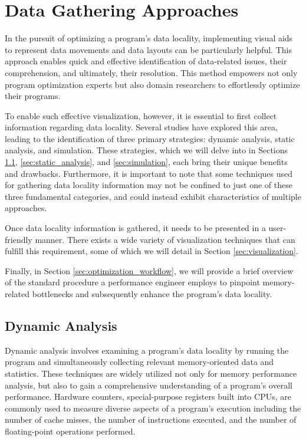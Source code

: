 \section{Data Gathering Approaches}\label{sec:methods}
In the pursuit of optimizing a program's data locality, implementing visual aids to represent data movements and data layouts can be particularly helpful. This approach enables quick and effective identification of data-related issues, their comprehension, and ultimately, their resolution. This method empowers not only program optimization experts but also domain researchers to effortlessly optimize their programs.

To enable such effective visualization, however, it is essential to first collect information regarding data locality. Several studies have explored this area, leading to the identification of three primary strategies: dynamic analysis, static analysis, and simulation. These strategies, which we will delve into in Sections \ref{sec:dynamic_analysis}, \ref{sec:static_analysis}, and \ref{sec:simulation}, each bring their unique benefits and drawbacks. Furthermore, it is important to note that some techniques used for gathering data locality information may not be confined to just one of these three fundamental categories, and could instead exhibit characteristics of multiple approaches.

Once data locality information is gathered, it needs to be presented in a user-friendly manner. There exists a wide variety of visualization techniques that can fulfill this requirement, some of which we will detail in Section \ref{sec:visualization}.

Finally, in Section \ref{sec:optimization_workflow}, we will provide a brief overview of the standard procedure a performance engineer employs to pinpoint memory-related bottlenecks and subsequently enhance the program's data locality.

\subsection{Dynamic Analysis}\label{sec:dynamic_analysis}
Dynamic analysis involves examining a program's data locality by running the program and simultaneously collecting relevant memory-oriented data and statistics. These techniques are widely utilized not only for memory performance analysis, but also to gain a comprehensive understanding of a program's overall performance. Hardware counters, special-purpose registers built into CPUs, are commonly used to measure diverse aspects of a program's execution including the number of cache misses, the number of instructions executed, and the number of floating-point operations performed.


